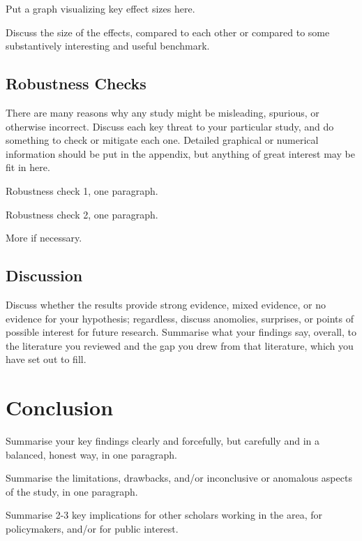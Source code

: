 \documentclass[12pt, oneside]{article}   	%
\begin{document}
Put a graph visualizing key effect sizes here.

Discuss the size of the effects, compared to each other or compared to some substantively interesting and useful benchmark.

\subsection{Robustness Checks}

There are many reasons why any study might be misleading, spurious, or otherwise incorrect. Discuss each key threat to your particular study, and do something to check or mitigate each one. Detailed graphical or numerical information should be put in the appendix, but anything of great interest may be fit in here.

Robustness check 1, one paragraph.

Robustness check 2, one paragraph.

More if necessary.

\subsection{Discussion}

Discuss whether the results provide strong evidence, mixed evidence, or no evidence for your hypothesis; regardless, discuss anomolies, surprises, or points of possible interest for future research. Summarise what your findings say, overall, to the literature you reviewed and the gap you drew from that literature, which you have set out to fill.

\section{Conclusion}

Summarise your key findings clearly and forcefully, but carefully and in a balanced, honest way, in one paragraph.

Summarise the limitations, drawbacks, and/or inconclusive or anomalous aspects of the study, in one paragraph.

Summarise 2-3 key implications for other scholars working in the area, for policymakers, and/or for public interest.
\end{document}
